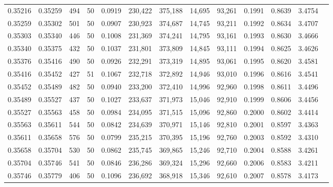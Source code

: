\begin{tabular}{rrrrrrrrrrrrr}
0.35216 & 0.35259 &   494 &  50 &                                     0.0919 & 230,422 & 375,188 &  14,695 &  93,261 & 0.1991 & 0.8639 & 3.4754 \\
0.35259 & 0.35302 &   501 &  50 &                                     0.0907 & 230,923 & 374,687 &  14,745 &  93,211 & 0.1992 & 0.8634 & 3.4707 \\
0.35303 & 0.35340 &   446 &  50 &                                     0.1008 & 231,369 & 374,241 &  14,795 &  93,161 & 0.1993 & 0.8630 & 3.4666 \\
0.35340 & 0.35375 &   432 &  50 &                                     0.1037 & 231,801 & 373,809 &  14,845 &  93,111 & 0.1994 & 0.8625 & 3.4626 \\
0.35376 & 0.35416 &   490 &  50 &                                     0.0926 & 232,291 & 373,319 &  14,895 &  93,061 & 0.1995 & 0.8620 & 3.4581 \\
0.35416 & 0.35452 &   427 &  51 &                                     0.1067 & 232,718 & 372,892 &  14,946 &  93,010 & 0.1996 & 0.8616 & 3.4541 \\
0.35452 & 0.35489 &   482 &  50 &                                     0.0940 & 233,200 & 372,410 &  14,996 &  92,960 & 0.1998 & 0.8611 & 3.4496 \\
0.35489 & 0.35527 &   437 &  50 &                                     0.1027 & 233,637 & 371,973 &  15,046 &  92,910 & 0.1999 & 0.8606 & 3.4456 \\
0.35527 & 0.35563 &   458 &  50 &                                     0.0984 & 234,095 & 371,515 &  15,096 &  92,860 & 0.2000 & 0.8602 & 3.4414 \\
0.35563 & 0.35611 &   544 &  50 &                                     0.0842 & 234,639 & 370,971 &  15,146 &  92,810 & 0.2001 & 0.8597 & 3.4363 \\
0.35611 & 0.35658 &   576 &  50 &                                     0.0799 & 235,215 & 370,395 &  15,196 &  92,760 & 0.2003 & 0.8592 & 3.4310 \\
0.35658 & 0.35704 &   530 &  50 &                                     0.0862 & 235,745 & 369,865 &  15,246 &  92,710 & 0.2004 & 0.8588 & 3.4261 \\
0.35704 & 0.35746 &   541 &  50 &                                     0.0846 & 236,286 & 369,324 &  15,296 &  92,660 & 0.2006 & 0.8583 & 3.4211 \\
0.35746 & 0.35779 &   406 &  50 &                                     0.1096 & 236,692 & 368,918 &  15,346 &  92,610 & 0.2007 & 0.8578 & 3.4173 \\

\end{tabular}
